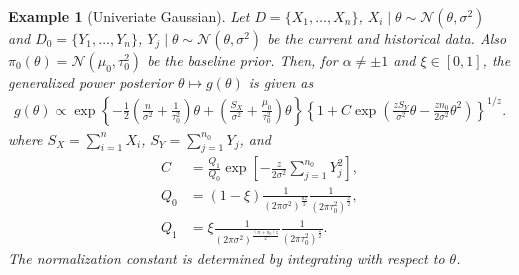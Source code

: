 \documentclass[12pt]{article}
\newtheorem{example}{Example}
\begin{document}
\begin{example}[Univeriate Gaussian]
    Let $D = \{X_1,\dots,X_n\}$, $X_i \mid \theta \sim \mathcal{N}(\theta, \sigma^2)$ and $D_0 = \{Y_1,\dots,Y_n\}$, $Y_j \mid \theta \sim \mathcal{N}(\theta, \sigma^2)$ be the current and historical data.
    Also $\pi_0(\theta) = \mathcal{N}(\mu_0, \tau_0^2)$ be the baseline prior.
    Then, for $\alpha \neq \pm 1$ and $\xi \in [0, 1]$, the generalized power posterior $\theta \mapsto g(\theta)$ is given as
    \begin{align*}
       g(\theta) \propto \exp\left\{-\frac{1}{2}\left(\frac{n}{\sigma^2} + \frac{1}{\tau_0^2}\right)\theta + \left(\frac{S_X}{\sigma^2} + \frac{\mu_0}{\tau_0^2}\right)\theta\right\}\left\{1 + C\exp\left(\frac{z S_Y}{\sigma^2}\theta - \frac{z n_0}{2\sigma^2}\theta^2\right)\right\}^{1/z}.
   \end{align*}
    where $S_X = \sum^n_{i=1}X_i$, $S_Y = \sum^{n_0}_{j=1}Y_j$, and
    \begin{align*}
        C &= \frac{Q_1}{Q_0}\exp\left[-\frac{z}{2\sigma^2}\sum^{n_0}_{j=1}Y_j^2\right], \\
        Q_0 &= (1 - \xi)\frac{1}{(2\pi\sigma^2)^{\frac{nz}{2}}}\frac{1}{(2\pi\tau_0^2)^{\frac{z}{2}}}, \\
        Q_1 &= \xi\frac{1}{(2\pi\sigma^2)^{\frac{(n + n_0)z}{2}}}\frac{1}{(2\pi\tau_0^2)^{\frac{z}{2}}}.
    \end{align*}
    The normalization constant is determined by integrating with respect to $\theta$.
\end{example}
\end{document}
